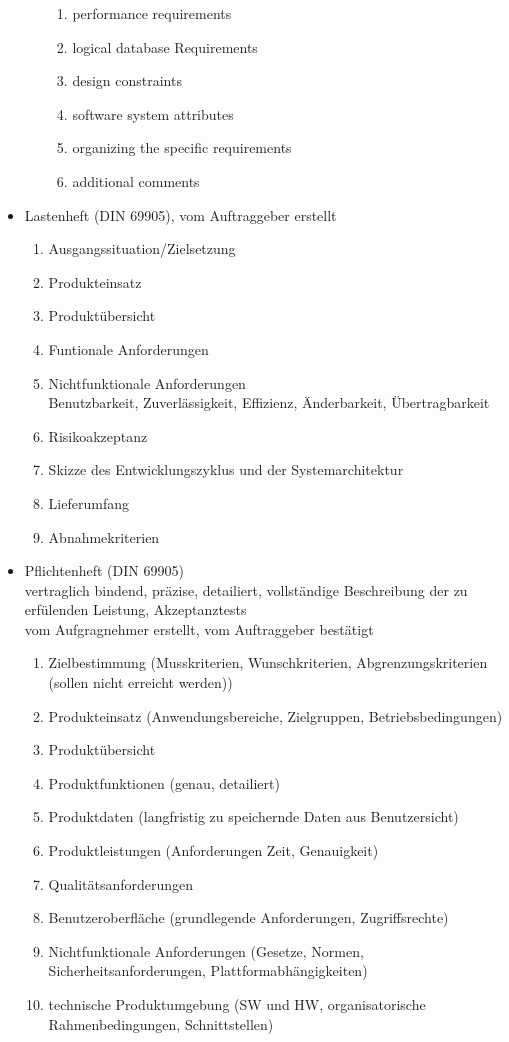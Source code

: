 \documentclass[a4paper, 10pt]{article}
\begin{document}
\begin{itemize}
\begin{enumerate}
\begin{enumerate}
			\item performance requirements
			\item logical database Requirements
			\item design constraints
			\item software system attributes
			\item organizing the specific requirements
			\item additional comments
		\end{enumerate}
	\end{enumerate}
	\item Lastenheft (DIN 69905), vom Auftraggeber erstellt
	\begin{enumerate}
		\item Ausgangssituation/Zielsetzung
		\item Produkteinsatz
		\item Produktübersicht
		\item Funtionale Anforderungen
		\item Nichtfunktionale Anforderungen \\
			Benutzbarkeit, Zuverlässigkeit, Effizienz, Änderbarkeit, Übertragbarkeit
		\item Risikoakzeptanz
		\item Skizze des Entwicklungszyklus und der Systemarchitektur
		\item Lieferumfang
		\item Abnahmekriterien
	\end{enumerate}
	\item Pflichtenheft (DIN 69905) \\
	vertraglich bindend, präzise, detailiert, vollständige Beschreibung der zu erfülenden Leistung, Akzeptanztests\\
	vom Aufgragnehmer erstellt, vom Auftraggeber bestätigt
	\begin{enumerate}
		\item Zielbestimmung (Musskriterien, Wunschkriterien, Abgrenzungskriterien (sollen nicht erreicht werden))
		\item Produkteinsatz (Anwendungsbereiche, Zielgruppen, Betriebsbedingungen)
		\item Produktübersicht
		\item Produktfunktionen (genau, detailiert)
		\item Produktdaten (langfristig zu speichernde Daten aus Benutzersicht)
		\item Produktleistungen (Anforderungen Zeit, Genauigkeit)
		\item Qualitätsanforderungen
		\item Benutzeroberfläche (grundlegende Anforderungen, Zugriffsrechte)
		\item Nichtfunktionale Anforderungen (Gesetze, Normen, Sicherheitsanforderungen, Plattformabhängigkeiten)
		\item technische Produktumgebung (SW und HW, organisatorische Rahmenbedingungen, Schnittstellen)
	\end{enumerate}
\end{itemize}
\end{document}

